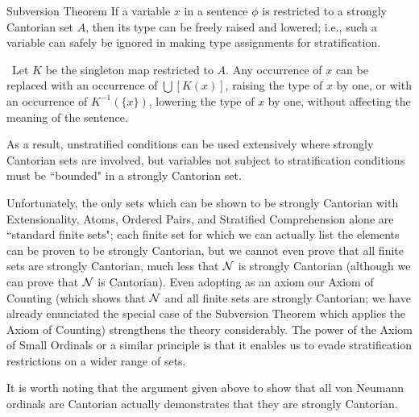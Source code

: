 \begin{Thm}{Subversion Theorem}
 If a variable $x$ in a sentence $\phi$ is restricted to a strongly
 Cantorian set $A$, then its type can be freely raised and lowered; i.e., such a variable can safely
 be ignored in making type assignments for
 stratification.
\end{Thm}

\preuve\ Let $K$ be the singleton map restricted to
$A$.  Any occurrence of $x$ can be replaced with an occurrence of
$\bigcup[K(x)]$, raising the type of $x$ by one, or with an occurrence of
$K^{-1}(\{x\})$, lowering the type of $x$ by one, without affecting the meaning
of the sentence.
\finpreuve

As a result, unstratified conditions can be used
extensively where strongly Cantorian sets are
involved, but variables not subject to stratification
conditions must be ``bounded" in a strongly Cantorian
set.

Unfortunately, the only sets which can be shown to be strongly
Cantorian with
Extensionality, Atoms, Ordered
Pairs, and Stratified Comprehension alone are ``standard finite
sets"; each finite set for which we can actually list the elements can be
proven to be strongly Cantorian, but we cannot even prove that all finite sets
are strongly Cantorian, much less that ${\cal N}$ is strongly Cantorian
(although we can prove that ${\cal N}$ is Cantorian). Even
adopting as an axiom our Axiom of Counting (which
shows that $\cal N$ and all finite sets are strongly Cantorian; we have
already enunciated the special case of the Subversion Theorem which applies the Axiom of Counting) strengthens the theory
considerably.   The power of the Axiom of Small Ordinals or a similar principle is that it enables us to evade
stratification restrictions on a wider range of sets.

It is worth noting that the argument given above to show that all von
Neumann ordinals are
Cantorian actually demonstrates that they are
strongly Cantorian.


